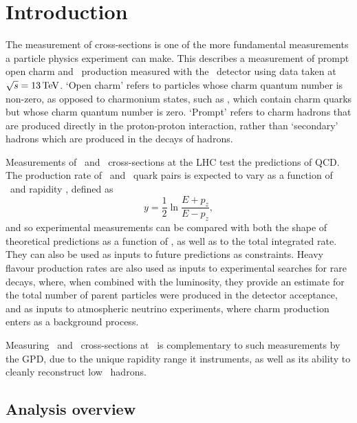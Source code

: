 \chapter{Introduction}
\label{chap:prod:introduction}

The measurement of cross-sections is one of the more fundamental measurements a 
particle physics experiment can make.
This  describes a measurement of prompt open charm and 
\ccbar\ production measured with the \lhcb\ detector using data taken at 
$\sqrts = \SI{13}{\TeV}$.
`Open charm' refers to particles whose charm quantum number is non-zero, as 
opposed to charmonium states, such as \PJpsi, which contain charm quarks but 
whose charm quantum number is zero.
`Prompt' refers to charm hadrons that are produced directly in the 
proton-proton interaction, rather than `secondary' hadrons which are produced 
in the decays of \PB hadrons.

Measurements of \ccbar\ and \bbbar\ cross-sections at the \ac{LHC} test the 
predictions of \ac{QCD}.
The production rate of \ccbar\ and \bbbar\ quark pairs is expected to vary as a 
function of \pT\ and rapidity \rapidity, defined as
\begin{equation}
  y = \frac{1}{2}\ln{\frac{E + p_{z}}{E - p_{z}}},
  \label{eqn:prod:introduction:rapidity}
\end{equation}
and so experimental measurements can be compared with both the shape of 
theoretical predictions as a function of \pTy, as well as to the total 
integrated rate.
They can also be used as inputs to future predictions as constraints.
Heavy flavour production rates are also used as inputs to experimental searches 
for rare decays, where, when combined with the luminosity, they provide an 
estimate for the total number of parent particles were produced in the detector 
acceptance, and as inputs to atmospheric neutrino experiments, where charm 
production enters as a background process.

Measuring \ccbar\ and \bbbar\ cross-sections at \lhcb\ is complementary to such 
measurements by the \ac{GPD}, due to the unique rapidity range it instruments, 
as well as its ability to cleanly reconstruct low \pT\ hadrons.

\section{Analysis overview}
\label{chap:prod:introduction:analysis_overview}


